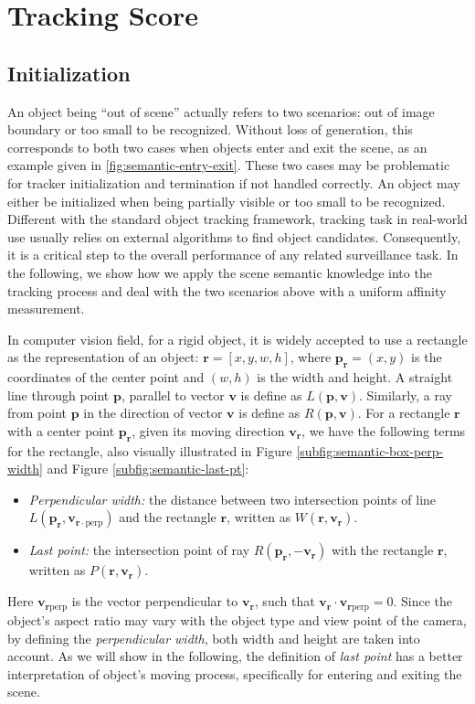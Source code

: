 \section{Tracking Score}
\subsection{Initialization}
     
    An object being ``out of scene'' actually refers to two scenarios: out of image boundary or too small to be recognized. Without loss of generation, this corresponds to both two cases when objects enter and exit the scene, as an example given in \ref{fig:semantic-entry-exit}. 
    These two cases may be problematic for tracker initialization and termination if not handled correctly. An object may either be initialized when being partially visible or too small to be recognized. 
    Different with the standard object tracking framework, tracking task in real-world use usually relies on external algorithms to find object candidates. Consequently, it is a critical step to the overall performance of any related surveillance task.
    In the following, we show how we apply the scene semantic knowledge into the tracking process and deal with the two scenarios above with a uniform affinity measurement. 

    
    
    In computer vision field, for a rigid object, it is widely accepted to use a rectangle as the representation of an object: $\bm{r} = [x, y, w, h]$, where $\bm{p_r}=(x, y)$ is the coordinates of the center point and $(w, h)$ is the width and height.
    A straight line through point $\bm{p}$, parallel to vector $\bm{v}$ is define as $L(\bm{p}, \bm{v})$. Similarly, a ray from point $\bm{p}$ in the direction of vector $\bm{v}$ is define as $R(\bm{p}, \bm{v})$.
    For a rectangle $\bm{r}$ with a center point $\bm{p_r}$, given its moving direction $\bm{v_r}$, we have the following terms for the rectangle, also visually illustrated in Figure \ref{subfig:semantic-box-perp-width} and Figure \ref{subfig:semantic-last-pt}:  
    \begin{itemize}
        \item \emph{Perpendicular width:} the distance between two intersection points of line $L(\bm{p_r}, \bm{v}_{\bm{r}\cdot\text{perp}})$ and the rectangle $\bm{r}$, written as $W(\bm{r}, \bm{v_r})$. 
        \item \emph{Last point:} the intersection point of ray $R(\bm{p_r}, \bm{-v_r})$ with the rectangle $\bm{r}$, written as $P(\bm{r}, \bm{v_r})$.
    \end{itemize}
    Here $\bm{v}_{\bm{r}\text{perp}}$ is the vector perpendicular to $\bm{v_r}$, such that $\bm{v_r}\cdot\bm{v}_{\bm{r}\text{perp}}=0$. Since the object's aspect ratio may vary with the object type and view point of the camera, by defining the \emph{perpendicular width}, both width and height are taken into account. As we will show in the following, the definition of \emph{last point} has a better interpretation of object's moving process, specifically for entering and exiting the scene.

